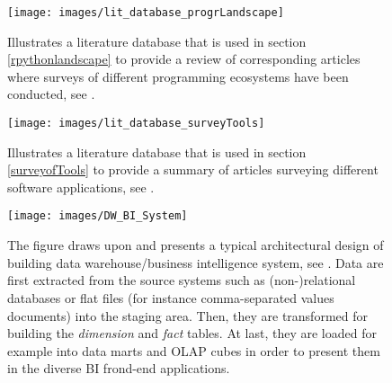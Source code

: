 \begin{landscape}
\begin{figure}[ht]
\centering
\texttt{[image: images/lit\_database\_progrLandscape]}
\caption[Illustrates a literature database that is used for reviewing R and Python ecosystem.]{Illustrates a literature database that is used in section \ref{rpythonlandscape} to provide a review of corresponding articles where surveys of different programming ecosystems have been conducted, see .}
\label{fig-literature-programLandscape}
\end{figure}
\end{landscape}

\begin{landscape}
\begin{figure}[ht]
\centering
\texttt{[image: images/lit\_database\_surveyTools]}
\caption[Illustrates a literature database that is used for inspecting studies which survey computer programs.]{Illustrates a literature database that is used in section \ref{surveyofTools} to provide a summary of articles surveying different software applications, see .}
\label{fig-literature-database}
\end{figure}
\end{landscape}

\begin{landscape}
\begin{figure}[ht]
\centering
\texttt{[image: images/DW\_BI\_System]}
\caption[Illustrates a typical approach to building DW/BI system.]{The figure draws upon \textcites{WarrenThornthwaite2012MicrosoftApproach}{Kimball2008TheToolkit} and presents a typical architectural design of building data warehouse/business intelligence system, see . 
Data are first extracted from the source systems such as (non-)relational databases or flat files (for instance comma-separated values documents) into the staging area. 
Then, they are transformed for building the \emph{dimension} and \emph{fact} tables. 
At last, they are loaded for example into data marts and \ac{OLAP} cubes in order to present them in the diverse \ac{BI} frond-end applications.}
\label{fig-bi-dw-schema}
\end{figure}
\end{landscape}

